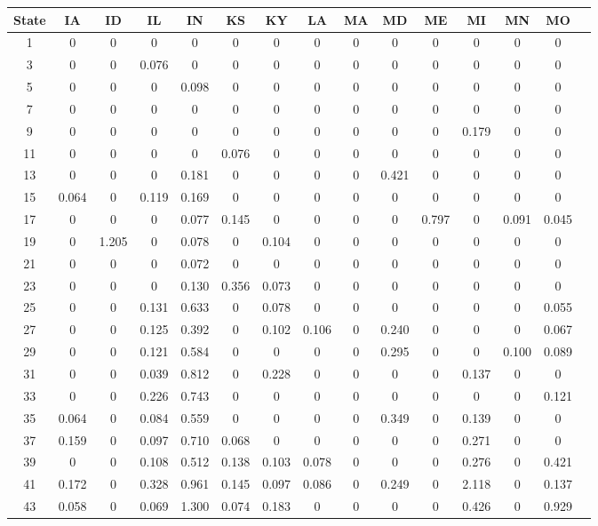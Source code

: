 \begin{table*}[htb]
\footnotesize
    \centering
    \begin{tabular}{|c |c |c |c |c |c |c |c |c |c |c |c |c |c |c|}\hline
        \textbf{State} & \textbf{IA}& \textbf{ID}& \textbf{IL}& \textbf{IN}& \textbf{KS}& \textbf{KY}& \textbf{LA}& \textbf{MA}& \textbf{MD}& \textbf{ME}& \textbf{MI}& \textbf{MN}& \textbf{MO} \\\hline
    1&0& 0& 0& 0& 0& 0& 0& 0& 0& 0& 0& 0& 0\\\hline
3&0& 0& 0.076& 0& 0& 0& 0& 0& 0& 0& 0& 0& 0\\\hline
5&0& 0& 0& 0.098& 0& 0& 0& 0& 0& 0& 0& 0& 0\\\hline
7&0& 0& 0& 0& 0& 0& 0& 0& 0& 0& 0& 0& 0\\\hline
9&0& 0& 0& 0& 0& 0& 0& 0& 0& 0& 0.179& 0& 0\\\hline
11&0& 0& 0& 0& 0.076& 0& 0& 0& 0& 0& 0& 0& 0\\\hline
13&0& 0& 0& 0.181& 0& 0& 0& 0& 0.421& 0& 0& 0& 0\\\hline
15&0.064& 0& 0.119& 0.169& 0& 0& 0& 0& 0& 0& 0& 0& 0\\\hline
17&0& 0& 0& 0.077& 0.145& 0& 0& 0& 0& 0.797& 0& 0.091& 0.045\\\hline
19&0& 1.205& 0& 0.078& 0& 0.104& 0& 0& 0& 0& 0& 0& 0\\\hline
21&0& 0& 0& 0.072& 0& 0& 0& 0& 0& 0& 0& 0& 0\\\hline
23&0& 0& 0& 0.130& 0.356& 0.073& 0& 0& 0& 0& 0& 0& 0\\\hline
25&0& 0& 0.131& 0.633& 0& 0.078& 0& 0& 0& 0& 0& 0& 0.055\\\hline
27&0& 0& 0.125& 0.392& 0& 0.102& 0.106& 0& 0.240& 0& 0& 0& 0.067\\\hline
29&0& 0& 0.121& 0.584& 0& 0& 0& 0& 0.295& 0& 0& 0.100& 0.089\\\hline
31&0& 0& 0.039& 0.812& 0& 0.228& 0& 0& 0& 0& 0.137& 0& 0\\\hline
33&0& 0& 0.226& 0.743& 0& 0& 0& 0& 0& 0& 0& 0& 0.121\\\hline
35&0.064& 0& 0.084& 0.559& 0& 0& 0& 0& 0.349& 0& 0.139& 0& 0\\\hline
37&0.159& 0& 0.097& 0.710& 0.068& 0& 0& 0& 0& 0& 0.271& 0& 0\\\hline
39&0& 0& 0.108& 0.512& 0.138& 0.103& 0.078& 0& 0& 0& 0.276& 0& 0.421\\\hline
41&0.172& 0& 0.328& 0.961& 0.145& 0.097& 0.086& 0& 0.249& 0& 2.118& 0& 0.137\\\hline
43&0.058& 0& 0.069& 1.300& 0.074& 0.183& 0& 0& 0& 0& 0.426& 0& 0.929\\\hline

\end{tabular}
\end{table*}
